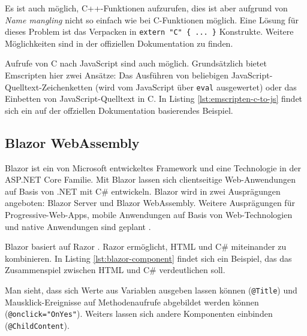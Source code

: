 

Es ist auch möglich, C++-Funktionen aufzurufen, dies ist aber aufgrund von \emph{Name mangling} nicht so einfach wie bei C-Funktionen möglich. Eine Lösung für dieses Problem ist das Verpacken in \lstinline|extern "C" { ... }| Konstrukte. Weitere Möglichkeiten sind in der offiziellen Dokumentation zu finden.

Aufrufe von C nach JavaScript sind auch möglich. Grundsätzlich bietet Emscripten hier zwei Ansätze: Das Ausführen von beliebigen JavaScript-Quelltext-Zeichenketten (wird vom JavaScript über \lstinline{eval} ausgewertet) oder das Einbetten von JavaScript-Quelltext in C. In Listing \ref{lst:emscripten-c-to-js} findet sich ein auf der offziellen Dokumentation basierendes Beispiel.



\subsection{Blazor WebAssembly}
Blazor \cite{Blazor} ist ein von Microsoft entwickeltes Framework und eine Technologie in der ASP.NET Core Familie. Mit Blazor lassen sich clientseitige Web-Anwendungen auf Basis von .NET mit C\#{} entwickeln. Blazor wird in zwei Ausprägungen angeboten: Blazor Server und Blazor WebAssembly. Weitere Ausprägungen für Progressive-Web-Apps, mobile Anwendungen auf Basis von Web-Technologien und native Anwendungen sind geplant \cite{BlazorBlog}.

Blazor basiert auf Razor \cite{Razor}. Razor ermöglicht, HTML und C\#{} miteinander zu kombinieren. In Listing \ref{lst:blazor-component} findet sich ein Beispiel, das das Zusammenspiel zwischen HTML und C\#{} verdeutlichen soll.



Man sieht, dass sich Werte aus Variablen ausgeben lassen können (\lstinline{@Title}) und Maus\-klick-Ereignisse auf Methodenaufrufe abgebildet werden können (\lstinline{@onclick="OnYes"}). Weiters lassen sich andere Komponenten einbinden (\lstinline{@ChildContent}).

